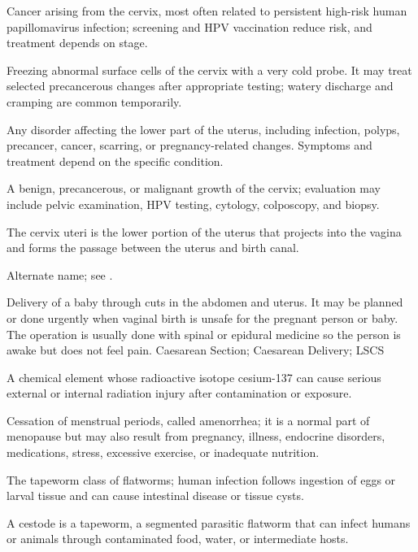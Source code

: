  Cancer arising from the cervix, most often related to persistent high-risk human papillomavirus infection; screening and HPV vaccination reduce risk, and treatment depends on stage.

 Freezing abnormal surface cells of the cervix with a very cold probe. It may treat selected precancerous changes after appropriate testing; watery discharge and cramping are common temporarily.

 Any disorder affecting the lower part of the uterus, including infection, polyps, precancer, cancer, scarring, or pregnancy-related changes. Symptoms and treatment depend on the specific condition.

 A benign, precancerous, or malignant growth of the cervix; evaluation may include pelvic examination, HPV testing, cytology, colposcopy, and biopsy.

 The cervix uteri is the lower portion of the uterus that projects into the vagina and forms the passage between the uterus and birth canal.

 Alternate name; see .

 Delivery of a baby through cuts in the abdomen and uterus. It may be planned or done urgently when vaginal birth is unsafe for the pregnant person or baby. The operation is usually done with spinal or epidural medicine so the person is awake but does not feel pain.
\synonyms
Caesarean Section; Caesarean Delivery; LSCS


 A chemical element whose radioactive isotope cesium-137 can cause serious external or internal radiation injury after contamination or exposure.

 Cessation of menstrual periods, called amenorrhea; it is a normal part of menopause but may also result from pregnancy, illness, endocrine disorders, medications, stress, excessive exercise, or inadequate nutrition.

 The tapeworm class of flatworms; human infection follows ingestion of eggs or larval tissue and can cause intestinal disease or tissue cysts.

 A cestode is a tapeworm, a segmented parasitic flatworm that can infect humans or animals through contaminated food, water, or intermediate hosts.

